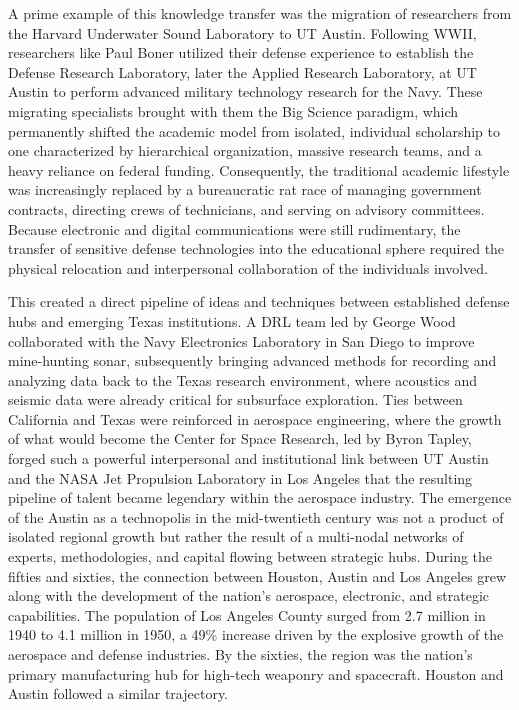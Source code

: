 A prime example of this knowledge transfer was the migration of researchers from the Harvard Underwater Sound Laboratory to UT Austin. Following WWII, researchers like Paul Boner utilized their defense experience to establish the Defense Research Laboratory, later the Applied Research Laboratory, at UT Austin to perform advanced military technology research for the Navy. These migrating specialists brought with them the Big Science paradigm, which permanently shifted the academic model from isolated, individual scholarship to one characterized by hierarchical organization, massive research teams, and a heavy reliance on federal funding. Consequently, the traditional academic lifestyle was increasingly replaced by a bureaucratic rat race of managing government contracts, directing crews of technicians, and serving on advisory committees. Because electronic and digital communications were still rudimentary, the transfer of sensitive defense technologies into the educational sphere required the physical relocation and interpersonal collaboration of the individuals involved. 

This created a direct pipeline of ideas and techniques between established defense hubs and emerging Texas institutions. A DRL team led by George Wood collaborated with the Navy Electronics Laboratory in San Diego to improve mine-hunting sonar, subsequently bringing advanced methods for recording and analyzing data back to the Texas research environment, where acoustics and seismic data were already critical for subsurface exploration. Ties between California and Texas were reinforced in aerospace engineering, where the growth of what would become the Center for Space Research, led by Byron Tapley, forged such a powerful interpersonal and institutional link between UT Austin and the NASA Jet Propulsion Laboratory in Los Angeles that the resulting pipeline of talent became legendary within the aerospace industry. The emergence of the Austin as a technopolis in the mid-twentieth century was not a product of isolated regional growth but rather the result of a multi-nodal networks of experts, methodologies, and capital flowing between strategic hubs. During the fifties and sixties, the connection between Houston, Austin and Los Angeles grew along with the development of the nation's aerospace, electronic, and strategic capabilities. The population of Los Angeles County surged from 2.7 million in 1940 to 4.1 million in 1950, a 49\% increase driven by the explosive growth of the aerospace and defense industries. By the sixties, the region was the nation's primary manufacturing hub for high-tech weaponry and spacecraft. Houston and Austin followed a similar trajectory. 

